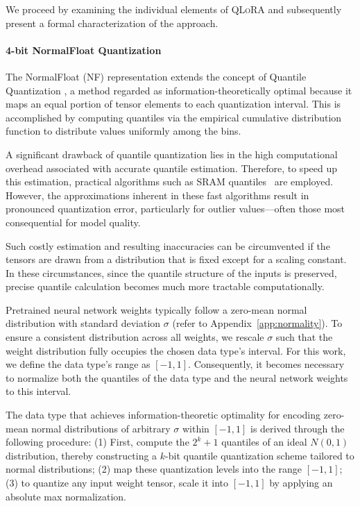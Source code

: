 We proceed by examining the individual elements of \textsc{QLoRA} and subsequently present a formal characterization of the approach.

\paragraph{4-bit NormalFloat Quantization} The NormalFloat (NF) representation extends the concept of Quantile Quantization \citep{dettmers2022optimizers}, a method regarded as information-theoretically optimal because it maps an equal portion of tensor elements to each quantization interval. This is accomplished by computing quantiles via the empirical cumulative distribution function to distribute values uniformly among the bins.

A significant drawback of quantile quantization lies in the high computational overhead associated with accurate quantile estimation. Therefore, to speed up this estimation, practical algorithms such as SRAM quantiles~\citep{dettmers2022optimizers} are employed. However, the approximations inherent in these fast algorithms result in pronounced quantization error, particularly for outlier values—often those most consequential for model quality.

Such costly estimation and resulting inaccuracies can be circumvented if the tensors are drawn from a distribution that is fixed except for a scaling constant. In these circumstances, since the quantile structure of the inputs is preserved, precise quantile calculation becomes much more tractable computationally.

Pretrained neural network weights typically follow a zero-mean normal distribution with standard deviation $\sigma$ (refer to Appendix~\ref{app:normality}). To ensure a consistent distribution across all weights, we rescale $\sigma$ such that the weight distribution fully occupies the chosen data type's interval. For this work, we define the data type's range as $[-1, 1]$. Consequently, it becomes necessary to normalize both the quantiles of the data type and the neural network weights to this interval.

The data type that achieves information-theoretic optimality for encoding zero-mean normal distributions of arbitrary $\sigma$ within $[-1, 1]$ is derived through the following procedure: (1) First, compute the $2^k+1$ quantiles of an ideal $N(0, 1)$ distribution, thereby constructing a $k$-bit quantile quantization scheme tailored to normal distributions; (2) map these quantization levels into the range $[-1, 1]$; (3) to quantize any input weight tensor, scale it into $[-1, 1]$ by applying an absolute max normalization.

